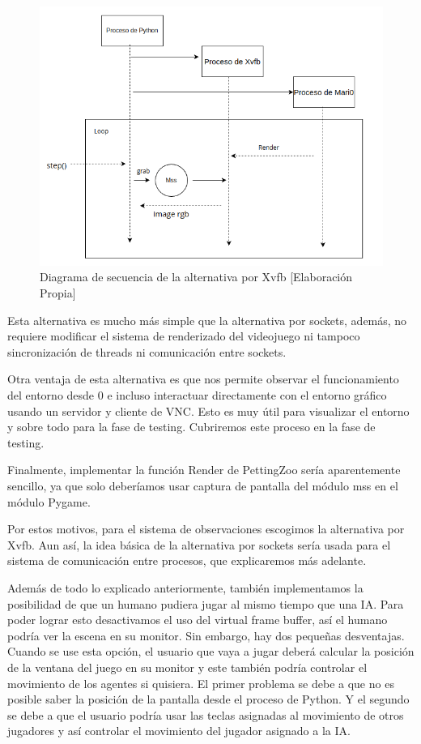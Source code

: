 \begin{figure}[ht]
    \centering
    \includegraphics[width=1.0\textwidth]{img/obsevation_sequence.png}
    \caption{Diagrama de secuencia de la alternativa por Xvfb [Elaboración Propia]}
    \label{fig:alternativa-2-seq}
\end{figure}

Esta alternativa es mucho más simple que la alternativa por sockets, además, no requiere modificar el sistema de renderizado del videojuego ni tampoco sincronización de threads ni comunicación entre sockets. 

Otra ventaja de esta alternativa es que nos permite observar el funcionamiento del entorno desde 0 e incluso interactuar directamente con el entorno gráfico usando un servidor y cliente de VNC. Esto es muy útil para visualizar el entorno y sobre todo para la fase de testing. Cubriremos este proceso en la fase de testing.

Finalmente, implementar la función Render de PettingZoo sería aparentemente sencillo, ya que solo deberíamos usar captura de pantalla del módulo mss en el módulo Pygame.

Por estos motivos, para el sistema de observaciones escogimos la alternativa por Xvfb. Aun así, la idea básica de la alternativa por sockets sería usada para el sistema de comunicación entre procesos, que explicaremos más adelante. 

Además de todo lo explicado anteriormente, también implementamos la posibilidad de que un humano pudiera jugar al mismo tiempo que una IA. Para poder lograr esto desactivamos el uso del virtual frame buffer, así el humano podría ver la escena en su monitor. Sin embargo, hay dos pequeñas desventajas. Cuando se use esta opción, el usuario que vaya a jugar deberá calcular la posición de la ventana del juego en su monitor y este también podría controlar el movimiento de los agentes si quisiera. El primer problema se debe a que no es posible saber la posición de la pantalla desde el proceso de Python. Y el segundo se debe a que el usuario podría usar las teclas asignadas al movimiento de otros jugadores y así controlar el movimiento del jugador asignado a la IA.


